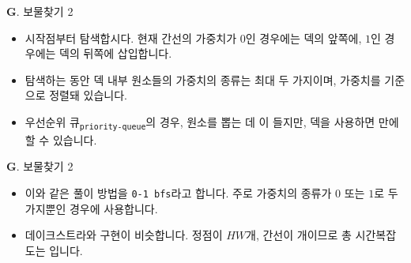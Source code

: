 \begin{frame}{\textbf{G}. 보물찾기 2}
	\begin{itemize}
		\item 시작점부터 탐색합시다. 현재 간선의 가중치가 $0$인 경우에는 덱의 앞쪽에, $1$인 경우에는 덱의 뒤쪽에 삽입합니다.
		\item 탐색하는 동안 덱 내부 원소들의 가중치의 종류는 최대 두 가지이며, 가중치를 기준으로 정렬돼 있습니다.
		\item 우선순위 큐\textsubscript{\texttt{\color{kupc-gray}priority-queue}}의 경우, 원소를 뽑는 데 이 들지만, 덱을 사용하면 만에 할 수 있습니다.
	\end{itemize}
\end{frame}


\begin{frame}{\textbf{G}. 보물찾기 2}
	\begin{itemize}
		\item 이와 같은 풀이 방법을 \texttt{0-1 bfs}라고 합니다. 주로 가중치의 종류가 $0$ 또는 $1$로 두 가지뿐인 경우에 사용합니다.
		\item 데이크스트라와 구현이 비슷합니다. 정점이 $HW$개, 간선이 개이므로 총 시간복잡도는 입니다.
	\end{itemize}
\end{frame}